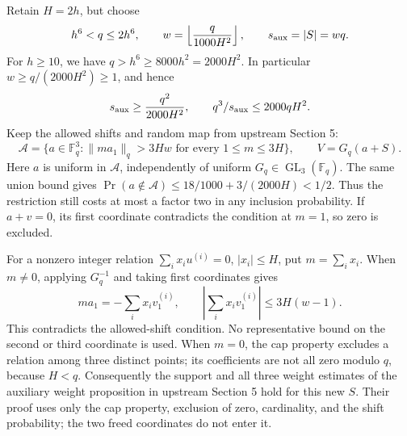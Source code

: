 \documentclass[11pt]{article}
\begin{document}
Retain \(H=2h\), but choose
\[
 h^6<q\le2h^6,\qquad
 w=\left\lfloor\frac{q}{1000H^2}\right\rfloor,
 \qquad s_{\rm aux}=|S|=wq.
\]
For \(h\ge10\), we have \(q>h^6\ge8000h^2=2000H^2\).
In particular \(w\ge q/(2000H^2)\ge1\), and hence
\begin{equation}\label{eq:slab-size}
 s_{\rm aux}\ge\frac{q^2}{2000H^2},\qquad
 q^3/s_{\rm aux}\le2000qH^2.
\end{equation}
Keep the allowed shifts and random map from upstream Section 5:
\[
 \mathcal A=\{a\in\mathbb F_q^3:
     \|ma_1\|_q>3Hw\text{ for every }1\le m\le3H\},
 \qquad V=G_q(a+S).
\]
Here \(a\) is uniform in \(\mathcal A\), independently of uniform
\(G_q\in\operatorname{GL}_3(\mathbb F_q)\).
The same union bound gives
\(\Pr(a\notin\mathcal A)\le18/1000+3/(2000H)<1/2\).
Thus the restriction still costs at most a factor two in any inclusion
probability. If \(a+v=0\), its first coordinate contradicts the
condition at \(m=1\), so zero is excluded.

For a nonzero integer relation \(\sum_i x_i u^{(i)}=0\),
\(|x_i|\le H\), put \(m=\sum_i x_i\). When \(m\ne0\),
applying \(G_q^{-1}\) and taking first coordinates gives
\[
 ma_1=-\sum_i x_i v^{(i)}_1,\qquad
 \left|\sum_i x_i v^{(i)}_1\right|\le3H(w-1).
\]
This contradicts the allowed-shift condition. No representative bound
on the second or third coordinate is used. When \(m=0\), the cap
property excludes a relation among three distinct points; its
coefficients are not all zero modulo \(q\), because \(H<q\).
Consequently the support and all three weight estimates of the auxiliary
weight proposition in upstream Section 5 hold for this new \(S\).
Their proof uses only the cap
property, exclusion of zero, cardinality, and the shift probability;
the two freed coordinates do not enter it.
\end{document}
